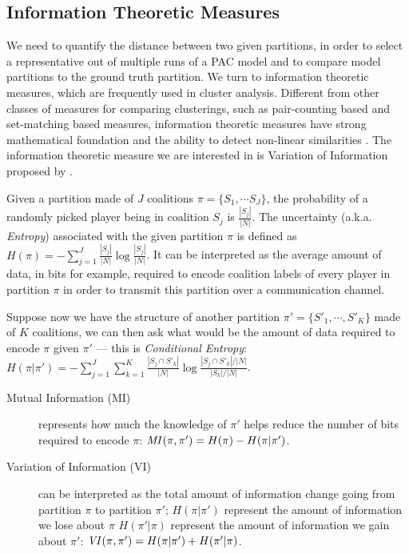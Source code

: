 \subsection{Information Theoretic Measures}
\label{subsec:information_theoretic_measures}

We need to quantify the distance between two given partitions, in order
to select a representative out of multiple runs of a PAC model and to compare
model partitions to the ground truth partition.
We turn to information theoretic measures, which are frequently used in cluster
analysis.
Different from other classes of measures for comparing clusterings, such as
pair-counting based and set-matching based measures, information theoretic
measures have strong mathematical foundation and the ability to detect
non-linear similarities \cite{Vinh:2010:ITM:1756006.1953024}.
The information theoretic measure we are interested in is Variation of
Information proposed by .

Given a partition made of $J$ coalitions $\pi = \{S_1, \cdots S_J\}$, the
probability of a randomly picked player being in coalition $S_j$ is
$\frac{|S_j|}{|N|}$.
The uncertainty (a.k.a. \textit{Entropy}) associated with the given partition
$\pi$ is defined as
$H(\pi) = - \sum^J_{j=1} \frac{|S_j|}{|N|} \log{\frac{|S_j|}{|N|}}$.
It can be interpreted as the average amount of data, in bits for example,
required to encode coalition labels of every player in partition $\pi$ in order
to transmit this partition over a communication channel.

Suppose now we have the structure of another partition 
$\pi' = \{S'_1, \cdots, S'_K\}$ made of $K$ coalitions, we can then ask what
would be the amount of data required to encode $\pi$ given $\pi'$ 
--- this is \textit{Conditional Entropy}:
$H(\pi|\pi') = - \sum^J_{j=1} \sum^K_{k=1} \frac{|S_j \cap S'_k|}{|N|} \log{\frac{|S_j \cap S'_k|/|N|}{|S_k|/|N|}}$.

\begin{description}
    \item[Mutual Information (MI)] represents how much the knowledge of
$\pi'$ helps reduce the number of bits required to encode $\pi$:
$\mathit{MI}(\pi, \pi') = H(\pi) - H(\pi|\pi')$.
    \item[Variation of Information (VI)] can be interpreted as the total 
amount of information change going from partition $\pi$ to partition $\pi'$;
$H(\pi|\pi')$ represent the amount of information we lose about $\pi$
$H(\pi'|\pi)$ represent the amount of information we gain about $\pi'$:
$\mathit{VI}(\pi, \pi') = H(\pi|\pi') + H(\pi'|\pi)$.
\end{description}

